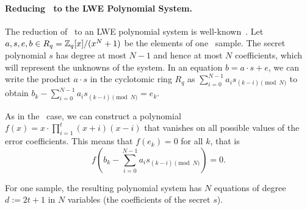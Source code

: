 \paragraph{Reducing \rlwe\ to the LWE Polynomial System.} The reduction of \rlwe\ to an LWE polynomial system is well-known~\cite{EC:LyuPeiReg10}. %
Let \(a, s, e, b \in R_q = \mathbb{Z}_q[x]/(x^N + 1)\) be the elements of one \rlwe\ sample. The secret polynomial $s$ has degree at most $N-1$ and hence at most $N$ coefficients, which will represent the unknowns of the system. 
In an equation \(b = a \cdot s + e\), we can write the product \(a \cdot s\) in the cyclotomic ring \(R_q\) as $\sum_{i=0}^{N-1} a_i s_{(k-i) \pmod N}$ to obtain %
$b_k - \sum_{i=0}^{N-1} a_i s_{(k-i) \pmod{N}} = e_k.$



As in the \slwe\ case, we can construct a polynomial \(f(x) = x \cdot \prod_{i=1}^{t} (x+i)(x-i)\) that vanishes on all possible values of the error coefficients. This means that \(f(e_k) = 0\) for all \(k\), that is \[f\left(b_k - \sum_{i=0}^{N-1} a_i s_{(k-i) \pmod N}\right) = 0.\]

For one sample, the resulting polynomial system has \(N\) equations of degree \(d := 2t+1\) in \(N\) variables (the coefficients of the secret $s$).


